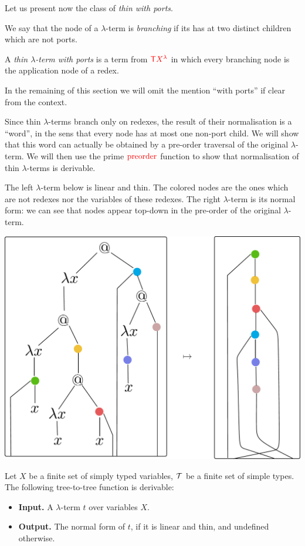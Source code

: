 Let us present now the class of \emph{thin \lambdaterms with ports}.
 
\begin{definition}
We say that the node of a $\lambda$-term is \emph{branching} if its has at two distinct children which are not ports.
 
A \emph{thin $\lambda$-term with ports} is a term from ${\color{red}{\mathsf T}} {\color{red}{{X}^{{\color{red}{\lambda}}}}}$ in which every branching node is the application node of a redex. 
\end{definition}
In the remaining of this section we will omit the mention ``with ports'' if clear from the context.

Since thin $\lambda$-terms branch only on redexes, the result of their normalisation is a ``word'', in the sens that every node has at most one non-port child.  We will show that this word can actually be obtained by a pre-order traversal of the original $\lambda$-term. We will then use the prime ${\color{red}{\mathrm{preorder}}}$ function to show that normalisation of thin $\lambda$-terms is derivable. 

The left $\lambda$-term below is linear and thin. The colored nodes are the ones which are not redexes nor the variables of these redexes. The right $\lambda$-term is its normal form: we can see that  nodes appear top-down in the pre-order  of the original $\lambda$-term.  
\begin{center}
		\includegraphics[scale=.2]{pictures/normalisation-thin}
		\end{center}

\begin{proposition}\label{prop:EvaluateThin}
    Let $X$ be a finite set of simply typed variables, $\mathcal T$ be a finite set of simple types.
    The following tree-to-tree function is derivable:
    \begin{itemize}
        \item{\bf Input.} A $\lambda$-term $t$ over variables $X$.
        \item {\bf Output.} The normal form of $t$, if it is linear and thin, and undefined otherwise.
    \end{itemize}
\end{proposition}

